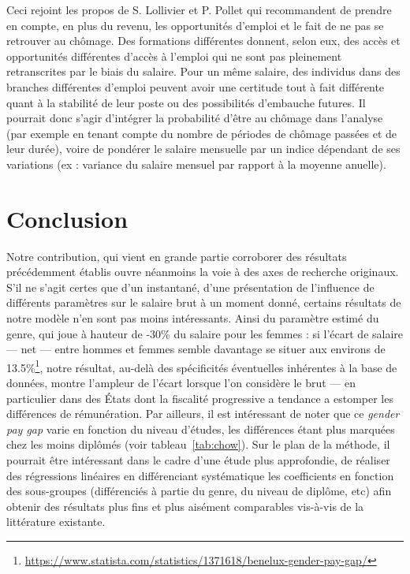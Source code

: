 \documentclass[a4paper, french, 11 pt]{article}\usepackage[]{graphicx}\usepackage[]{xcolor}
\begin{document}
Ceci rejoint les propos de S. Lollivier et P. Pollet qui recommandent de prendre en compte, en plus du revenu, les opportunités d’emploi et le fait de ne pas se retrouver au chômage. Des formations différentes donnent, selon eux, des accès et opportunités différentes d’accès à l’emploi qui ne sont pas pleinement retranscrites par le biais du salaire. Pour un même salaire, des individus dans des branches différentes d’emploi peuvent avoir une certitude tout à fait différente quant à la stabilité de leur poste ou des possibilités d’embauche futures. Il pourrait donc s'agir d'intégrer la probabilité d'être au chômage dans l'analyse (par exemple en tenant compte du nombre de périodes de chômage passées et de leur durée), voire de pondérer le salaire mensuelle par un indice dépendant de ses variations (ex : variance du salaire mensuel par rapport à la moyenne anuelle). 

\section*{Conclusion}
         
         Notre contribution, qui vient en grande partie corroborer des résultats précédemment établis ouvre néanmoins la voie à des axes de recherche originaux. S'il ne s'agit certes que d'un instantané, d'une présentation de l'influence de différents paramètres sur le salaire brut à un moment donné, certains résultats de notre modèle n'en sont pas moins intéressants. Ainsi du paramètre estimé du genre, qui joue à hauteur de -30\% du salaire pour les femmes : si l'écart de salaire --- net --- entre hommes et femmes semble davantage se situer aux environs de 13.5\%\footnote{\url{https://www.statista.com/statistics/1371618/benelux-gender-pay-gap/}}, notre résultat, au-delà des spécificités éventuelles inhérentes à la base de données, montre l'ampleur de l'écart lorsque l'on considère le brut --- en particulier dans des États dont la fiscalité progressive a tendance a estomper les différences de rémunération. Par ailleurs, il est intéressant de noter que ce \textit{gender pay gap} varie en fonction du niveau d'études, les différences étant plus marquées chez les moins diplômés (voir tableau~\ref{tab:chow}). Sur le plan de la méthode, il pourrait être intéressant dans le cadre d'une étude plus approfondie, de réaliser des régressions linéaires en différenciant systématique les coefficients en fonction des sous-groupes (différenciés à partie du genre, du niveau de diplôme, etc) afin obtenir des résultats plus fins et plus aisément comparables vis-à-vis de la littérature existante. 
\end{document}
